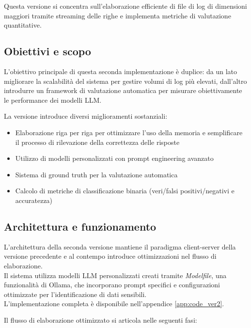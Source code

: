 \documentclass[12pt]{report}
\begin{document}
Questa versione si concentra sull'elaborazione efficiente di file di log di dimensioni maggiori tramite streaming delle righe e implementa metriche di valutazione quantitative.

\subsection{Obiettivi e scopo}
\label{subsec:ver2_obiettivi}

L'obiettivo principale di questa seconda implementazione è duplice: da un lato migliorare la scalabilità del sistema per gestire volumi di log più elevati, dall'altro introdurre un framework di valutazione automatica per misurare obiettivamente le performance dei modelli LLM.

La versione introduce diversi miglioramenti sostanziali:
\begin{itemize}
    \item Elaborazione riga per riga per ottimizzare l'uso della memoria e semplificare il processo di rilevazione della correttezza delle risposte
    \item Utilizzo di modelli personalizzati con prompt engineering avanzato
    \item Sistema di ground truth per la valutazione automatica
    \item Calcolo di metriche di classificazione binaria (veri/falsi positivi/negativi e accuratezza)
\end{itemize}

\subsection{Architettura e funzionamento}
\label{subsec:ver2_architettura}

L'architettura della seconda versione mantiene il paradigma client-server della versione precedente e al contempo introduce ottimizzazioni nel flusso di elaborazione. \\
Il sistema utilizza modelli LLM personalizzati creati tramite \textit{Modelfile}, una funzionalità di Ollama, che incorporano prompt specifici e configurazioni ottimizzate per l'identificazione di dati sensibili.\\
L'implementazione completa è disponibile nell'appendice \ref{app:code_ver2}.

Il flusso di elaborazione ottimizzato si articola nelle seguenti fasi:
\end{document}
